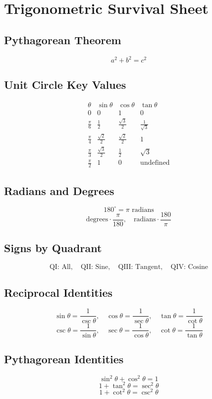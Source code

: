 \documentclass[12pt]{article}
\begin{document}
\section*{Trigonometric Survival Sheet}

\subsection*{Pythagorean Theorem}
\[
a^2 + b^2 = c^2
\]

\subsection*{Unit Circle Key Values}
\[
\begin{array}{c|c|c|c}
\theta & \sin \theta & \cos \theta & \tan \theta \\
\hline
0 & 0 & 1 & 0 \\
\frac{\pi}{6} & \frac{1}{2} & \frac{\sqrt{3}}{2} & \frac{1}{\sqrt{3}} \\
\frac{\pi}{4} & \frac{\sqrt{2}}{2} & \frac{\sqrt{2}}{2} & 1 \\
\frac{\pi}{3} & \frac{\sqrt{3}}{2} & \frac{1}{2} & \sqrt{3} \\
\frac{\pi}{2} & 1 & 0 & \text{undefined}
\end{array}
\]

\subsection*{Radians and Degrees}
\[
180^\circ = \pi \text{ radians}
\]
\[
\text{degrees} \cdot \frac{\pi}{180}, \quad \text{radians} \cdot \frac{180}{\pi}
\]

\subsection*{Signs by Quadrant}
\[
\text{QI: All}, \quad \text{QII: Sine}, \quad \text{QIII: Tangent}, \quad \text{QIV: Cosine}
\]

\subsection*{Reciprocal Identities}
\[
\sin \theta = \frac{1}{\csc \theta}, \quad 
\cos \theta = \frac{1}{\sec \theta}, \quad 
\tan \theta = \frac{1}{\cot \theta}
\]
\[
\csc \theta = \frac{1}{\sin \theta}, \quad 
\sec \theta = \frac{1}{\cos \theta}, \quad 
\cot \theta = \frac{1}{\tan \theta}
\]

\subsection*{Pythagorean Identities}
\[
\sin^2 \theta + \cos^2 \theta = 1
\]
\[
1 + \tan^2 \theta = \sec^2 \theta
\]
\[
1 + \cot^2 \theta = \csc^2 \theta
\]
\end{document}
